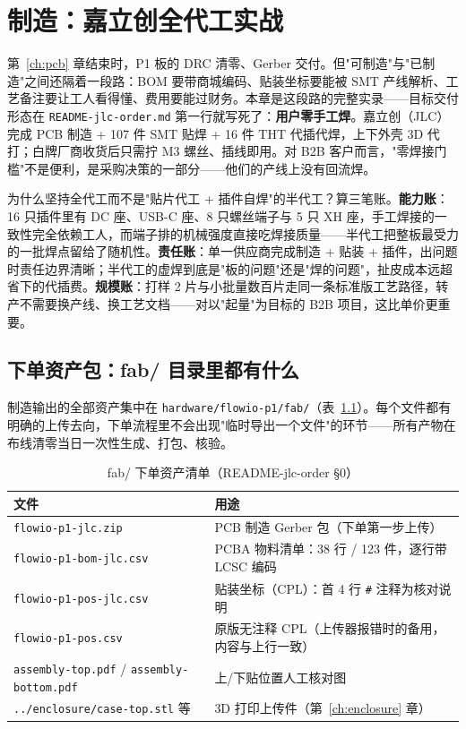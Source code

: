 \chapter{制造：嘉立创全代工实战}
\label{ch:fab}

第~\ref{ch:pcb} 章结束时，P1 板的 DRC 清零、Gerber 交付。但"可制造"与"已制造"之间还隔着一段路：BOM 要带商城编码、贴装坐标要能被 SMT 产线解析、工艺备注要让工人看得懂、费用要能过财务。本章是这段路的完整实录——目标交付形态在 \texttt{README-jlc-order.md} 第一行就写死了：\textbf{用户零手工焊}。嘉立创（JLC）完成 PCB 制造 + 107 件 SMT 贴焊 + 16 件 THT 代插代焊，上下外壳 3D 代打；白牌厂商收货后只需拧 M3 螺丝、插线即用。对 B2B 客户而言，"零焊接门槛"不是便利，是采购决策的一部分——他们的产线上没有回流焊。

为什么坚持全代工而不是"贴片代工 + 插件自焊"的半代工？算三笔账。\textbf{能力账}：16 只插件里有 DC 座、USB-C 座、8 只螺丝端子与 5 只 XH 座，手工焊接的一致性完全依赖工人，而端子排的机械强度直接吃焊接质量——半代工把整板最受力的一批焊点留给了随机性。\textbf{责任账}：单一供应商完成制造 + 贴装 + 插件，出问题时责任边界清晰；半代工的虚焊到底是"板的问题"还是"焊的问题"，扯皮成本远超省下的代插费。\textbf{规模账}：打样 2 片与小批量数百片走同一条标准版工艺路径，转产不需要换产线、换工艺文档——对以"起量"为目标的 B2B 项目，这比单价更重要。

\section{下单资产包：fab/ 目录里都有什么}
\label{sec:fab-assets}

制造输出的全部资产集中在 \texttt{hardware/flowio-p1/fab/}（表~\ref{tab:fab-files}）。每个文件都有明确的上传去向，下单流程里不会出现"临时导出一个文件"的环节——所有产物在布线清零当日一次性生成、打包、核验。

\begin{table}[htbp]
  \centering
  \caption{fab/ 下单资产清单（README-jlc-order \S0）}
  \label{tab:fab-files}
  \begin{tabular}{lp{9.2cm}}
    \toprule
    文件 & 用途 \\
    \midrule
    \texttt{flowio-p1-jlc.zip} & PCB 制造 Gerber 包（下单第一步上传） \\
    \texttt{flowio-p1-bom-jlc.csv} & PCBA 物料清单：38 行 / 123 件，逐行带 LCSC 编码 \\
    \texttt{flowio-p1-pos-jlc.csv} & 贴装坐标（CPL）：首 4 行 \texttt{\#} 注释为核对说明 \\
    \texttt{flowio-p1-pos.csv} & 原版无注释 CPL（上传器报错时的备用，内容与上行一致） \\
    \texttt{assembly-top.pdf} / \texttt{assembly-bottom.pdf} & 上/下贴位置人工核对图 \\
    \texttt{../enclosure/case-top.stl} 等 & 3D 打印上传件（第~\ref{ch:enclosure} 章） \\
    \bottomrule
  \end{tabular}
\end{table}

